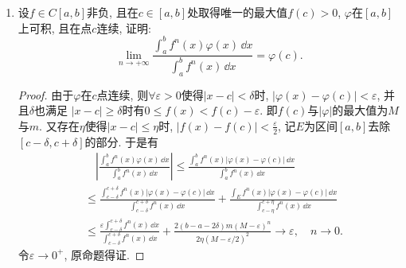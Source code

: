 \begin{quizb}
\begin{enumerate}
\item 设\(f\in C[a,b]\)非负, 且在\(c\in[a,b]\)处取得唯一的最大值\(f(c)>0\), 
\(\varphi\)在\([a,b]\)上可积, 且在点\(c\)连续, 证明: 
\[\lim_{n\rightarrow+\infty}\frac{\displaystyle\int_{a}^{b}f^n(x)\varphi(x)\,\dd x}{\displaystyle\int_{a}^{b}f^n(x)\,\dd x}=\varphi(c).\]
\begin{proof}
由于\(\varphi\)在\(c\)点连续, 则\(\forall \varepsilon>0\)使得\(|x-c|<\delta\)时, 
\(|\varphi(x)-\varphi(c)|<\varepsilon\), 并且\(\delta\)也满足
\(|x-c|\geqslant\delta\)时有\(0\leqslant f(x)<f(c)-\varepsilon\). 
即\(f(c)\)与\(|\varphi|\)的最大值为\(M\)与\(m\). 
又存在\(\eta\)使得\(|x-c|\leqslant\eta\)时, \(|f(x)-f(c)|<\frac{\varepsilon}{2}\), 
记\(E\)为区间\([a,b]\)去除\([c-\delta,c+\delta]\)的部分. 于是有\[\begin{split}
&\quad\left|\frac{\displaystyle\int_{a}^{b}f^n(x)\varphi(x)\,\dd x}{\displaystyle\int_{a}^{b}f^n(x)\,\dd x}\right|
\leqslant\frac{\displaystyle\int_{a}^{b}f^n(x)|\varphi(x)-\varphi(c)|\,\dd x}{\displaystyle\int_{a}^{b}f^n(x)\,\dd x}\\
&\leqslant\frac{\displaystyle\int_{c-\delta}^{c+\delta}f^n(x)|\varphi(x)-\varphi(c)|\,\dd x}{\displaystyle\int_{c-\delta}^{c+\delta}f^n(x)\,\dd x}
+\frac{\displaystyle\int_{E}f^n(x)|\varphi(x)-\varphi(c)|\,\dd x}{\displaystyle\int_{c-\eta}^{c+\eta}f^n(x)\,\dd x}\\
&\leqslant\frac{\varepsilon\displaystyle\int_{c-\delta}^{c+\delta}f^n(x)\,\dd x}{\displaystyle\int_{c-\delta}^{c+\delta}f^n(x)\,\dd x}
+\frac{2(b-a-2\delta)m(M-\varepsilon)^n}{2\eta(M-\varepsilon/2)^2}\rightarrow \varepsilon,\quad n\rightarrow 0.
\end{split}\]
令\(\varepsilon\rightarrow 0^+\), 原命题得证.
\end{proof}


\end{enumerate}
\end{quizb}
